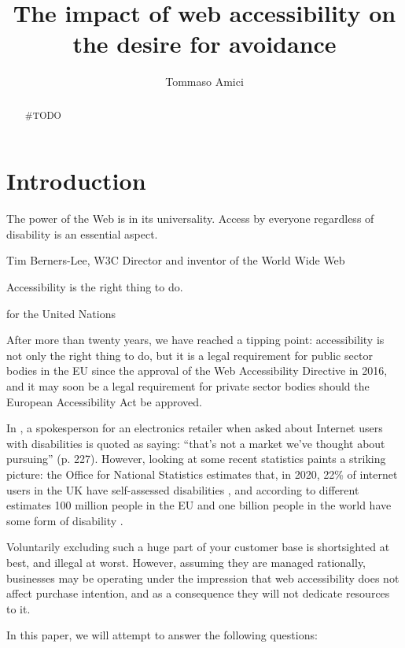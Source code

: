 \documentclass[12pt, a4paper]{article}
\title{The impact of web accessibility on the desire for avoidance}
\author{Tommaso Amici}
\begin{document}
\doublespacing
{}


\newpage


\begin{abstract}
  \#TODO
\end{abstract}
\newpage

\tableofcontents
\listoffigures
\listoftables
\newpage


\section{Introduction}

\epigraph{The power of the Web is in its universality. Access by everyone regardless
  of disability is an essential aspect.}{Tim Berners-Lee, W3C Director and inventor
  of the World Wide Web}

\epigraph{Accessibility is the right thing to do.}{ for the United Nations}

\noindent
After more than twenty years, we have reached a tipping point: accessibility is not only
the right thing to do, but it is a legal requirement for public sector bodies in the EU
since the approval of the Web Accessibility Directive in 2016, and it may soon be a legal
requirement for private sector bodies should the European Accessibility Act be approved.

In , a spokesperson for an electronics retailer when asked about
Internet users with disabilities is quoted as saying: ``that's not a market we've
thought about pursuing'' (p. 227). However, looking at some recent statistics paints a
striking picture: the Office for National Statistics estimates that, in 2020, 22\% of
internet users in the UK have self-assessed disabilities
\citeyear{ukinternetusers2020}, and according to different estimates 100 million people
in the EU and one billion people in the world have some form of disability
\cite{euWebAccessibility2021, whoDisability2021}.

Voluntarily excluding such a huge part of your customer base is shortsighted at best,
and illegal at worst. However, assuming they are managed rationally, businesses may be
operating under the impression that web accessibility does not affect purchase
intention, and as a consequence they will not dedicate resources to it.

In this paper, we will attempt to answer the following questions:
\end{document}
